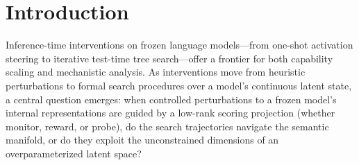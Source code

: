 \section{Introduction}\label{sec:introduction}

Inference-time interventions on frozen language models---from one-shot activation steering to iterative test-time tree search---offer a frontier for both capability scaling and mechanistic analysis. As interventions move from heuristic perturbations to formal search procedures over a model's continuous latent state, a central question emerges: when controlled perturbations to a frozen model's internal representations are guided by a low-rank scoring projection (whether monitor, reward, or probe), do the search trajectories navigate the semantic manifold, or do they exploit the unconstrained dimensions of an overparameterized latent space?

